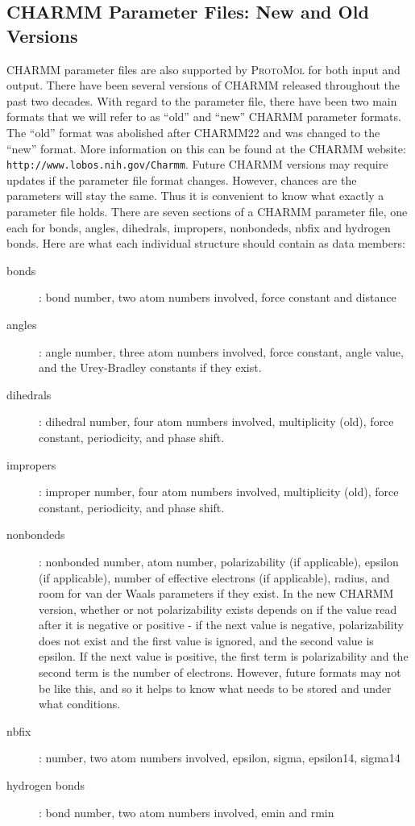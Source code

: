 \documentclass[11pt]{report}
\newcommand{\ProtoMol}{\textsc{ProtoMol }}
\begin{document}
\subsection{CHARMM Parameter Files: New and Old Versions}

CHARMM parameter files are also supported by \ProtoMol for both input and output.  There have been several versions of CHARMM released throughout the past two decades.  With regard to the parameter file, there have been two main formats that we will refer to as ``old'' and ``new'' CHARMM parameter formats.  The ``old'' format was abolished after CHARMM22 and was changed to the ``new'' format.  More information on this can be found at the CHARMM website:
\texttt {http://www.lobos.nih.gov/Charmm}.
Future CHARMM versions may require updates if the parameter file
format changes.  However, chances are the parameters will stay the
same.  Thus it is convenient to know what exactly a parameter file
holds.  There are seven sections of a CHARMM parameter file, one each
for bonds, angles, dihedrals, impropers, nonbondeds, nbfix and
hydrogen bonds.  Here are what each individual structure should
contain as data members:
\begin{description}
\item [bonds]:
bond number, two atom numbers involved, force constant and distance
\item [angles]: angle number, three atom numbers involved, force constant, angle value, and the Urey-Bradley constants if they exist.
\item [dihedrals]: dihedral number, four atom numbers involved, multiplicity (old), force constant, periodicity, and phase shift.
\item [impropers]: improper number, four atom numbers involved, multiplicity (old), force constant, periodicity, and phase shift.
\item [nonbondeds]: nonbonded number, atom number, polarizability (if applicable), epsilon (if applicable), number of effective electrons (if applicable), radius, and room for van der Waals parameters if they exist.  In the new CHARMM version, whether or not polarizability exists depends on if the value read after it is negative or positive - if the next value is negative, polarizability does not exist and the first value is ignored, and the second value is epsilon.  If the next value is positive, the first term is polarizability and the second term is the number of electrons.   However, future formats may not be like this, and so it helps to know what needs to be stored and under what conditions.
\item [nbfix]: number, two atom numbers involved, epsilon, sigma, epsilon14, sigma14
\item [hydrogen bonds]: bond number, two atom numbers involved, emin and rmin
\end{description}
\end{document}
